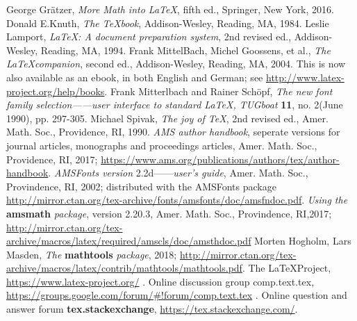 \documentclass[openany]{ctexrep}
\begin{document}
\begin{thebibliography}{2}
 George Gr\"atzer, \emph{More Math into \LaTeX}, fifth ed., Springer, New York, 2016.
 Donald E.Knuth, \emph{The \TeX book}, Addison-Wesley, Reading, MA, 1984.
 Leslie Lamport, \emph{\LaTeX: A document preparation system}, 2nd revised ed., Addison-Wesley, Reading, MA, 1994.
 Frank MittelBach, Michel Goossens, et al., \emph{The \LaTeX companion}, second ed., Addison-Wesley, Reading, MA, 2004. This is now also available as an ebook, in both English and German; see \url{http://www.latex-project.org/help/books}.
 Frank Mitterlbach and Rainer Sch\"opf, \emph{The new font family selection——user interface to standard \LaTeX, TUGboat} \textbf{11}, no. 2(June 1990), pp. 297-305.
 Michael Spivak, \emph{The joy of \TeX}, 2nd revised ed., Amer. Math. Soc., Providence, RI, 1990.
 \emph{AMS author handbook}, seperate versions for journal articles, monographs and proceedings articles, Amer. Math. Soc., Providence, RI, 2017; \url{https://www.ams.org/publications/authors/tex/author-handbook}.
\emph{AMSFonts version} 2.2d——\emph{user's guide}, Amer. Math. Soc., Provindence, RI, 2002; distributed with the AMSFonts package \url{http://mirror.ctan.org/tex-archive/fonts/amsfonts/doc/amsfndoc.pdf}.
\emph{Using the} {\bfseries amsmath} \emph{package}, version 2.20.3, Amer. Math. Soc., Provindence, RI,2017; \url{http://mirror.ctan.org/tex-archive/macros/latex/required/amscls/doc/amsthdoc.pdf}
Morten Hogholm, Lars Masden, \emph{The} {\bfseries mathtools} \emph{package}, 2018;
\url{http://mirror.ctan.org/tex-archive/macros/latex/contrib/mathtools/mathtools.pdf}.
The \LaTeX Project, \url{https://www.latex-project.org/}
.
\bibitem Online discussion group comp.text.tex, \url{https://groups.google.com/forum/\#!forum/comp.text.tex}
    .
Online question and answer forum {\bfseries tex.stackexchange},
\url{https://tex.stackexchange.com/}.
\end{thebibliography}
\end{document}
